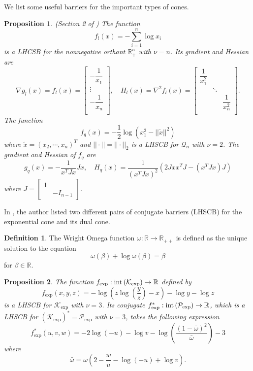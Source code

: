 \documentclass[10pt]{article}
\theoremstyle{definition}
\newtheorem{defin}{Definition}
\theoremstyle{plain}
\newtheorem{prop}{Proposition}
\begin{document}
We list some useful barriers for the important types of cones.

\begin{prop} \label{barriers_for_linear_and_lorentz_cone}
	\textnormal{(Section 2 of \cite{CVX})} The function 
	\[f_l(x) =-\sum_{i=1}^n \log x_i\]
	is a LHCSB for the nonnegative orthant $\mathbb{R}_+^{n}$ with $\nu = n$. Its gradient and Hessian are
	\[\nabla g_l(x) = f_l(x)= \begin{bmatrix}
	-\dfrac{1}{x_1} \\[2ex] \vdots \\[2ex] -\dfrac{1}{x_n} \\[1ex]
	\end{bmatrix},\quad 
	H_l(x) = \nabla^2 f_l(x) = \begin{bmatrix}
	\dfrac{1}{x_1^2} & 			  &				 			 \\[2ex] 
							& \ddots &						    \\[2ex] 
							&			 &	\dfrac{1}{x_n^2} \\[1ex]
	\end{bmatrix}. \]
	The function 
	\[f_q(x) = -\dfrac{1}{2}\log\left(x_1^2 - ||\tilde{x}||^2\right)\]
	where $\tilde{x} = \left(x_2,\cdots,x_n\right)^T$ and $||\cdot|| = ||\cdot||_2$ is a LHSCB for $\mathcal{Q}_n$ with $\nu = 2$. The gradient and Hessian of $f_q$ are
	\[g_q(x) = - \dfrac{1}{x^T J x} Jx, \quad H_q(x) =  \dfrac{1}{(x^T J x)^2}\left(2Jxx^T J - (x^T J x)J\right) \]
	where $J = \begin{bmatrix}
	1 & \\ & -I_{n-1}
	\end{bmatrix}$.
\end{prop}

In \cite{Akle_thesis}, the author listed two different pairs of conjugate barriers (LHSCB) for the exponential cone and its dual cone.

\begin{defin}
	The Wright Omega function $\omega: \mathbb{R} \rightarrow \mathbb{R}_{++}$ is defined as the unique solution to the equation 
	\[\omega(\beta) + \log \omega(\beta) = \beta \]
	for $\beta \in \mathbb{R}$.
\end{defin}

\begin{prop}
	The function $f_{\exp}: \textnormal{int}\left(\mathcal{K}_{\exp}\right) \rightarrow \mathbb{R}$ defined by 
	\[f_{\exp}(x,y,z) = -\log\left(z\log \left(\dfrac{y}{z}\right)-x\right) - \log y - \log z\]
	is a LHSCB for $\mathcal{K}_{\exp}$  with $\nu = 3$. 	Its conjugate $f_{\exp}^*: \textnormal{int}\left(\mathcal{P}_{\exp}\right) \rightarrow \mathbb{R}$, which is a LHSCB for $\left(\mathcal{K}_{\exp}\right)^* = \mathcal{P}_{\exp}$ with $\nu = 3$, takes the following expression 
	\[f_{\exp}^*(u,v,w) = -2 \log(-u) -\log v -\log\left(\dfrac{(1-\bar{\omega})^2}{\bar{\omega}}\right) - 3 \]
	where 
	\[\bar{\omega} = \omega\left(2-\dfrac{w}{u} - \log (-u) + \log v \right). \]
\end{prop}
\end{document}
